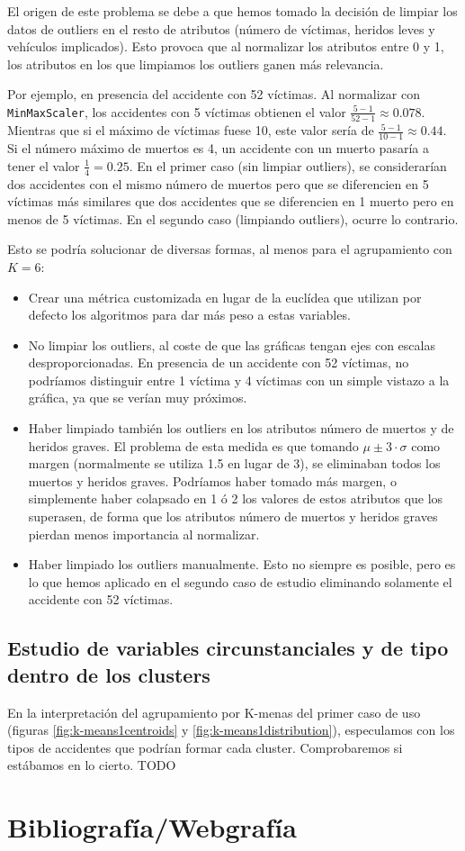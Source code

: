 \documentclass[oneside]{book}
\begin{document}
El origen de este problema se debe a que hemos tomado la decisión de
limpiar los datos de outliers en el resto de atributos (número de
víctimas, heridos leves y vehículos implicados). Esto provoca que al
normalizar los atributos entre 0 y 1, los atributos en los que
limpiamos los outliers ganen más relevancia.

Por ejemplo, en presencia del accidente con 52 víctimas. Al normalizar
con \texttt{MinMaxScaler}, los accidentes con 5 víctimas obtienen el
valor $\frac{5-1}{52-1}\approx 0.078$. Mientras que si el máximo de
víctimas fuese 10, este valor sería de $\frac{5-1}{10-1}\approx
0.44$. Si el número máximo de muertos es 4, un accidente con un muerto
pasaría a tener el valor $\frac{1}{4}=0.25$. En el primer caso (sin
limpiar outliers), se considerarían dos accidentes con el mismo número
de muertos pero que se diferencien en 5 víctimas más similares que dos
accidentes que se diferencien en 1 muerto pero en menos de 5
víctimas. En el segundo caso (limpiando outliers), ocurre lo
contrario.

Esto se podría solucionar de diversas formas, al menos para el
agrupamiento con $K=6$:
\begin{itemize}
\item Crear una métrica customizada en lugar de la euclídea que
  utilizan por defecto los algoritmos para dar más peso a estas
  variables.
\item No limpiar los outliers, al coste de que las gráficas tengan
  ejes con escalas desproporcionadas. En presencia de un accidente con
  52 víctimas, no podríamos distinguir entre 1 víctima y 4 víctimas
  con un simple vistazo a la gráfica, ya que se verían muy próximos.
\item Haber limpiado también los outliers en los atributos número de
  muertos y de heridos graves. El problema de esta medida es que
  tomando $\mu\pm 3\cdot\sigma$ como margen (normalmente se utiliza
  1.5 en lugar de 3), se eliminaban todos los muertos y heridos
  graves. Podríamos haber tomado más margen, o simplemente haber
  colapsado en 1 ó 2 los valores de estos atributos que los superasen,
  de forma que los atributos número de muertos y heridos graves
  pierdan menos importancia al normalizar.
\item Haber limpiado los outliers manualmente. Esto no siempre es
  posible, pero es lo que hemos aplicado en el segundo caso de estudio
  eliminando solamente el accidente con 52 víctimas.
\end{itemize}

\subsection{Estudio de variables circunstanciales y de tipo dentro de
  los clusters}

En la interpretación del agrupamiento por K-menas del primer caso de
uso (figuras \ref{fig:k-means1centroids} y
\ref{fig:k-means1distribution}), especulamos con los tipos de
accidentes que podrían formar cada cluster. Comprobaremos si estábamos
en lo cierto. TODO

\section{Bibliografía/Webgrafía}
\end{document}
